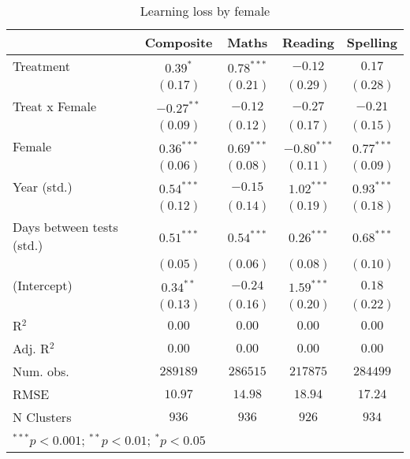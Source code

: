 
\begin{table}
\begin{center}
\begin{tabular}{l c c c c}
\hline
 & Composite & Maths & Reading & Spelling \\
\hline
Treatment                 & $0.39^{*}$   & $0.78^{***}$ & $-0.12$       & $0.17$       \\
                          & $(0.17)$     & $(0.21)$     & $(0.29)$      & $(0.28)$     \\
Treat x Female            & $-0.27^{**}$ & $-0.12$      & $-0.27$       & $-0.21$      \\
                          & $(0.09)$     & $(0.12)$     & $(0.17)$      & $(0.15)$     \\
Female                    & $0.36^{***}$ & $0.69^{***}$ & $-0.80^{***}$ & $0.77^{***}$ \\
                          & $(0.06)$     & $(0.08)$     & $(0.11)$      & $(0.09)$     \\
Year (std.)               & $0.54^{***}$ & $-0.15$      & $1.02^{***}$  & $0.93^{***}$ \\
                          & $(0.12)$     & $(0.14)$     & $(0.19)$      & $(0.18)$     \\
Days between tests (std.) & $0.51^{***}$ & $0.54^{***}$ & $0.26^{***}$  & $0.68^{***}$ \\
                          & $(0.05)$     & $(0.06)$     & $(0.08)$      & $(0.10)$     \\
(Intercept)               & $0.34^{**}$  & $-0.24$      & $1.59^{***}$  & $0.18$       \\
                          & $(0.13)$     & $(0.16)$     & $(0.20)$      & $(0.22)$     \\
\hline
R$^2$                     & $0.00$       & $0.00$       & $0.00$        & $0.00$       \\
Adj. R$^2$                & $0.00$       & $0.00$       & $0.00$        & $0.00$       \\
Num. obs.                 & $289189$     & $286515$     & $217875$      & $284499$     \\
RMSE                      & $10.97$      & $14.98$      & $18.94$       & $17.24$      \\
N Clusters                & $936$        & $936$        & $926$         & $934$        \\
\hline
\multicolumn{5}{l}{\scriptsize{$^{***}p<0.001$; $^{**}p<0.01$; $^{*}p<0.05$}}
\end{tabular}
\caption{Learning loss by female}
\label{tablefemale}
\end{center}
\end{table}
